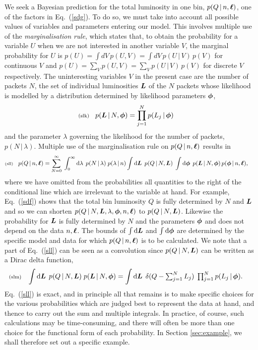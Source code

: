 \documentclass[11pt]{article}
\newcommand{\lleq}[1]{\label{#1} }
\renewcommand{\lleq}[1]{\label{#1} {\scriptstyle {\rm (#1)}} \hspace*{2ex} }
\newcommand{\cond}{\,|\,}
\newcommand{\rmdx}[1]{\dd{#1}} %
\begin{document}
We seek a Bayesian prediction for the total luminosity in one bin,
$p(Q\cond n,\bml)$, one of the factors in Eq.~(\ref{sdg}).  To do so,
we must take into account all possible values of variables and
parameters entering our model.  This involves multiple use of the
\textit{marginalisation rule}, which states that, to obtain the
probability for a variable $U$ when we are not interested in another
variable $V$, the marginal probability for $U$ is %
$p(U) = \int dV\,p(U,V) = \int dV\,p(U\cond V)\,p(V)$ for continuous
$V$ and $p(U) = \sum_V p(U,V) = \sum_V p(U\cond V)\,p(V)$ for discrete
$V$ respectively.
%
The uninteresting variables $V$ in the present case are the number of
packets $N$, the set of individual luminosities ${\bm{L}}$ of the $N$ packets
whose likelihood is modelled by a distribution determined by
likelihood parameters ${\bm{\phi}}$,
\begin{align}
  \lleq{slk}
  p(\bmL\cond N,\bmphi)
  &= \prod_{j=1}^{N} p(L_j\cond \bmphi)
\end{align}
and the parameter $\lambda$ governing the likelihood for the number of
packets, $p(N\cond\lambda)$. Multiple use of the marginalisation rule
on $p(Q\cond n,\bml)$ results in
\begin{align}
  \lleq{sll}
  p(Q\cond n,\bml)
  &= \sum_{N=0}^\infty \;\int_0^\infty \rmdx{\lambda}\;
    p(N\cond\lambda)\;
    p(\lambda\cond n)
    \int \rmdx{\bmL}\;
    p(Q\cond N,\bmL)\;
    \int \rmdx{\bmphi}\;
    p(\bmL\cond N,\bmphi)\,
    p(\bmphi\cond n,\bml),
\end{align}
where we have omitted from the probabilities all quantities to the
right of the conditional line which are irrelevant to the variable at
hand. For example, Eq.~(\ref{sdf}) shows that the total bin luminosity
$Q$ is fully determined by $N$ and ${\bm{L}}$ and so we can shorten
$p(Q\cond N,\bmL,\lambda,\bmphi,n,\bml)$ to $p(Q\cond N,\bmL)$. %
Likewise the probability for ${\bm{L}}$ is fully determined by $N$ and the
parameters ${\bm{\phi}}$ and does not depend on the data $n,{\bm{\ell}}$.  The
bounds of $\int \rmdx{\bmL}$ and $\int \rmdx{\bmphi}$ are determined by the
specific model and data for which $p(Q\cond n,\bml)$ is to be
calculated.
%
We note that a part of Eq.~(\ref{sll}) can be seen as a convolution
since $p(Q\cond N,\bmL)$ can be written as a Dirac delta function,
\begin{align}
  \lleq{slm}
  \int \rmdx{\bmL}\; p(Q\cond N,\bmL)\; p(\bmL\cond N,\bmphi)
  &= \int \rmdx{\bmL}\;\delta(Q - \textstyle\sum_{j=1}^N L_j)\; \prod_{j=1}^N p(L_j\cond \bmphi).
\end{align}
Eq.~(\ref{sll}) is exact, and in principle all that remains is to make
specific choices for the various probabilities which are judged best
to represent the data at hand, and thence to carry out the sum and
multiple integrals. In practice, of course, such calculations may be
time-consuming, and there will often be more than one choice for the
functional form of each probability. In Section \ref{sec:example}, we
shall therefore set out a specific example.
\end{document}
